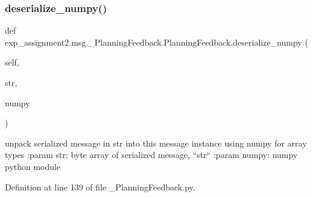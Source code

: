 \subsubsection{\texorpdfstring{deserialize\+\_\+numpy()}{deserialize\_numpy()}}
{\footnotesize\ttfamily def exp\+\_\+assignment2.\+msg.\+\_\+\+Planning\+Feedback.\+Planning\+Feedback.\+deserialize\+\_\+numpy (\begin{DoxyParamCaption}\item[{}]{self,  }\item[{}]{str,  }\item[{}]{numpy }\end{DoxyParamCaption})}

\begin{DoxyVerb}unpack serialized message in str into this message instance using numpy for array types
:param str: byte array of serialized message, ``str``
:param numpy: numpy python module
\end{DoxyVerb}
 

Definition at line 139 of file \+\_\+\+Planning\+Feedback.\+py.


